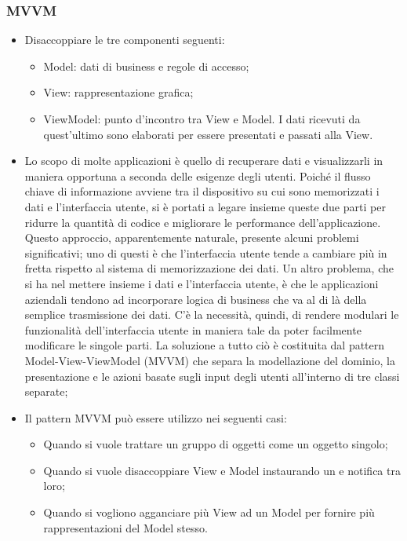 \subsubsection{MVVM}
\begin{itemize}
\item {} Disaccoppiare le tre componenti seguenti:
\begin{itemize}
\item Model: dati di business e regole di accesso;
\item View: rappresentazione grafica;
\item ViewModel: punto d'incontro tra View e Model. I dati ricevuti da quest'ultimo sono elaborati per essere presentati e passati alla View.
\end{itemize}
\item {} Lo scopo di molte applicazioni è quello di recuperare dati e visualizzarli in maniera opportuna a seconda delle esigenze degli utenti. Poiché il flusso chiave di informazione avviene tra il dispositivo su cui sono memorizzati i dati e l'interfaccia utente, si è portati a legare insieme queste due parti per ridurre la quantità di codice e migliorare le performance dell'applicazione. Questo approccio, apparentemente naturale, presente alcuni problemi significativi; uno di questi è che l'interfaccia utente tende a cambiare più in fretta rispetto al sistema di memorizzazione dei dati. Un altro problema, che si ha nel mettere insieme i dati e l'interfaccia utente, è che le applicazioni aziendali tendono ad incorporare logica di business che va al di là della semplice trasmissione dei dati. C'è la necessità, quindi, di rendere modulari le funzionalità dell'interfaccia utente in maniera tale da poter facilmente modificare le singole parti. La soluzione a tutto ciò è costituita dal pattern Model-View-ViewModel (MVVM) che separa la modellazione del dominio, la presentazione e le azioni basate sugli input degli utenti all'interno di tre classi separate;
\item {} Il pattern MVVM può essere utilizzo nei seguenti casi:
\begin{itemize}
\item Quando si vuole trattare un gruppo di oggetti come un oggetto singolo;
\item Quando si vuole disaccoppiare View e Model instaurando un  e notifica tra loro;
\item Quando si vogliono agganciare più View ad un Model per fornire più rappresentazioni del Model stesso.
\end{itemize}
\end{itemize}

